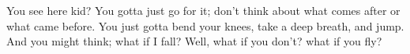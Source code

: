 \newpage
\thispagestyle{empty}%
\vspace*{\fill}
\begin{center}\Large{
You see here kid? You gotta just go for it; don't think about what comes after or what came before.
You just gotta bend your knees, take a deep breath, and jump. And you might think; what if I fall?
Well, what if you don't? what if you fly?
}
\end{center}
\vspace*{\fill}
